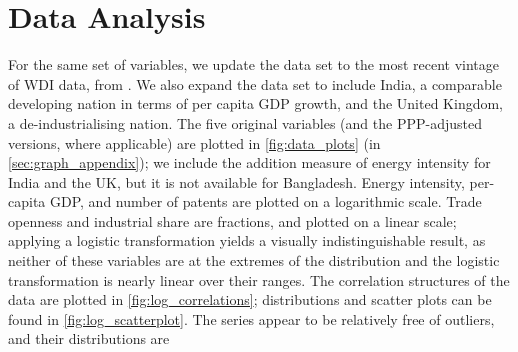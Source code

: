 \documentclass[11pt,a4paper]{article}
\begin{document}
\section{Data Analysis}\label{sec:data_analysis}
For the same set of variables, we update the data set to the most recent vintage of WDI data, from \cite{theworldbankWorldDevelopmentIndicators2019}.
We also expand the data set to include India, a comparable developing nation in terms of per capita GDP growth, and the United Kingdom, a de-industrialising nation.
The five original variables (and the PPP-adjusted versions, where applicable) are plotted in \cref{fig:data_plots} (in \cref{sec:graph_appendix}); we include the addition measure of energy intensity for India and the UK, but it is not available for Bangladesh.
Energy intensity, per-capita GDP, and number of patents are plotted on a logarithmic scale.
Trade openness and industrial share are fractions, and plotted on a linear scale; applying a logistic transformation yields a visually indistinguishable result, as neither of these variables are at the extremes of the distribution and the logistic transformation is nearly linear over their ranges.
The correlation structures of the data are plotted in \cref{fig:log_correlations}; distributions and scatter plots can be found in \cref{fig:log_scatterplot}.
The series appear to be relatively free of outliers, and their distributions are  
\end{document}

